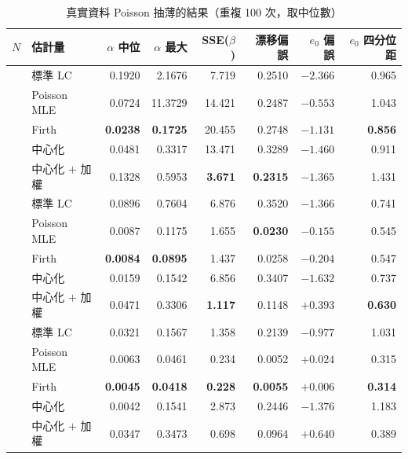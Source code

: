 \documentclass[UTF8, fontset=macnew, a4paper, 12pt]{ctexart}
\begin{document}
\begin{table}[H]
\centering
\caption{真實資料 Poisson 抽薄的結果（重複 100 次，取中位數）}
\small
\begin{tabular}{llrrrrrr}
\toprule
$N$ & 估計量 & $\alpha$ 中位 & $\alpha$ 最大 & SSE($\beta$) & 漂移偏誤 & $e_0$ 偏誤 & $e_0$ 四分位距\\
\midrule
{}
 & 標準 LC          & 0.1920 & 2.1676 & 7.719 & 0.2510 & $-2.366$ & 0.965\\
 & Poisson MLE       & 0.0724 & 11.3729 & 14.421 & 0.2487 & \textbf{$-0.553$} & 1.043\\
 & Firth            & \textbf{0.0238} & \textbf{0.1725} & 20.455 & 0.2748 & $-1.131$ & \textbf{0.856}\\
 & 中心化           & 0.0481 & 0.3317 & 13.471 & 0.3289 & $-1.460$ & 0.911\\
 & 中心化 $+$ 加權   & 0.1328 & 0.5953 & \textbf{3.671} & \textbf{0.2315} & $-1.365$ & 1.431\\
\midrule
{}
 & 標準 LC          & 0.0896 & 0.7604 & 6.876 & 0.3520 & $-1.366$ & 0.741\\
 & Poisson MLE       & 0.0087 & 0.1175 & 1.655 & \textbf{0.0230} & \textbf{$-0.155$} & 0.545\\
 & Firth            & \textbf{0.0084} & \textbf{0.0895} & 1.437 & 0.0258 & $-0.204$ & 0.547\\
 & 中心化           & 0.0159 & 0.1542 & 6.856 & 0.3407 & $-1.632$ & 0.737\\
 & 中心化 $+$ 加權   & 0.0471 & 0.3306 & \textbf{1.117} & 0.1148 & $+0.393$ & \textbf{0.630}\\
\midrule
{}
 & 標準 LC          & 0.0321 & 0.1567 & 1.358 & 0.2139 & $-0.977$ & 1.031\\
 & Poisson MLE       & 0.0063 & 0.0461 & 0.234 & 0.0052 & $+0.024$ & 0.315\\
 & Firth            & \textbf{0.0045} & \textbf{0.0418} & \textbf{0.228} & \textbf{0.0055} & \textbf{$+0.006$} & \textbf{0.314}\\
 & 中心化           & 0.0042 & 0.1541 & 2.873 & 0.2446 & $-1.376$ & 1.183\\
 & 中心化 $+$ 加權   & 0.0347 & 0.3473 & 0.698 & 0.0964 & $+0.640$ & 0.389\\
\bottomrule
\end{tabular}
\label{tab:real}
\end{table}
\end{document}
